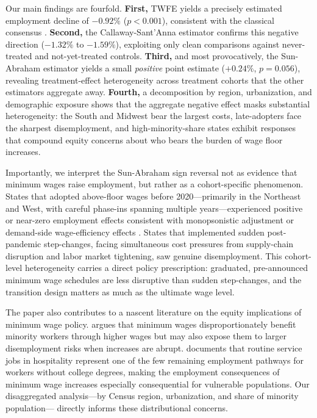 \documentclass[12pt]{article}
\begin{document}
Our main findings are fourfold.  \textbf{First,} TWFE yields a precisely
estimated employment decline of $-0.92\%$ ($p < 0.001$), consistent with the
classical consensus \citep{neumark2007minimum}.  \textbf{Second,} the
Callaway-Sant'Anna estimator confirms this negative direction ($-1.32\%$ to
$-1.59\%$), exploiting only clean comparisons against never-treated and
not-yet-treated controls.  \textbf{Third,} and most provocatively, the
Sun-Abraham estimator yields a small \emph{positive} point estimate ($+0.24\%$,
$p = 0.056$), revealing treatment-effect heterogeneity across treatment
cohorts that the other estimators aggregate away.  \textbf{Fourth,} a
decomposition by region, urbanization, and demographic exposure shows that the
aggregate negative effect masks substantial heterogeneity: the South and
Midwest bear the largest costs, late-adopters face the sharpest disemployment,
and high-minority-share states exhibit responses that compound equity concerns
about who bears the burden of wage floor increases.

Importantly, we interpret the Sun-Abraham sign reversal not as evidence that
minimum wages raise employment, but rather as a cohort-specific phenomenon.
States that adopted above-floor wages before 2020---primarily in the Northeast
and West, with careful phase-ins spanning multiple years---experienced positive
or near-zero employment effects consistent with monopsonistic adjustment or
demand-side wage-efficiency effects \citep{manning2021elusive,dube2019fairwage}.
States that implemented sudden post-pandemic step-changes, facing simultaneous
cost pressures from supply-chain disruption and labor market tightening, saw
genuine disemployment.  This cohort-level heterogeneity carries a direct
policy prescription: graduated, pre-announced minimum wage schedules are less
disruptive than sudden step-changes, and the transition design matters as much
as the ultimate wage level.

The paper also contributes to a nascent literature on the equity implications
of minimum wage policy.  \citet{wilson2021racial} argues that minimum wages
disproportionately benefit minority workers through higher wages but may also
expose them to larger disemployment risks when increases are abrupt.
\citet{autor2016workforce} documents that routine service jobs in hospitality
represent one of the few remaining employment pathways for workers without
college degrees, making the employment consequences of minimum wage increases
especially consequential for vulnerable populations.  Our disaggregated
analysis---by Census region, urbanization, and share of minority population---
directly informs these distributional concerns.
\end{document}
